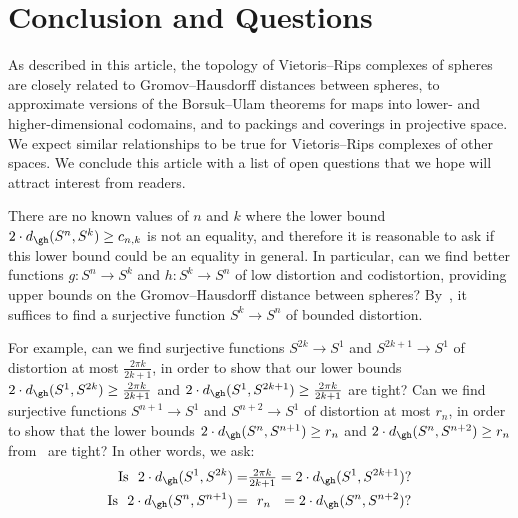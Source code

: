 \documentclass[11pt, reqno, english]{amsart}
\begin{document}
\section{Conclusion and Questions}
\label{sec:conclusion}

As described in this article, the topology of Vietoris--Rips complexes of spheres are closely related to Gromov--Hausdorff distances between spheres, to approximate versions of the Borsuk--Ulam theorems for maps into lower- and higher-dimensional codomains, and to packings and coverings in projective space.
We expect similar relationships to be true for Vietoris--Rips complexes of other spaces.
We conclude this article with a list of open questions that we hope will attract interest from readers.

\begin{question}
\label{ques:upper}
There are no known values of $n$ and $k$ where the lower bound 
$2\cdot d_{\gh}(S^n, S^k) \geq c_{n,k}$
is not an equality, and therefore it is reasonable to ask if this lower bound could be an equality in general.
In particular, can we find better functions $g\colon S^n \to S^k$ and $h\colon S^k \to S^n$ of low distortion and codistortion, providing upper bounds on the Gromov--Hausdorff distance between spheres?
By~\cite[Remark~1.1]{lim2021gromov}, it suffices to find a surjective function $S^k \to S^n$ of bounded distortion.

For example, can we find surjective functions $S^{2k} \to S^1$ and $S^{2k+1} \to S^1$ of distortion at most $\frac{2\pi k}{2k+1}$, in order to show that our lower bounds $2\cdot d_\gh(S^1,S^{2k})\ge \frac{2\pi k}{2k+1}$ and $2\cdot d_\gh(S^1,S^{2k+1})\ge \frac{2\pi k}{2k+1}$ are tight?
Can we find surjective functions $S^{n+1} \to S^1$ and $S^{n+2} \to S^1$ of distortion at most $r_n$, in order to show that the lower bounds $2\cdot d_\gh(S^n,S^{n+1})\ge r_n$ and $2\cdot d_\gh(S^n,S^{n+2})\ge r_n$ from~\cite{lim2021gromov} are tight?
In other words, we ask:
\begin{align*}
\text{Is\ \ }2\cdot d_{\gh}(S^1,S^{2k})=&\tfrac{2\pi k}{2k+1}=2\cdot d_{\gh}(S^1,S^{2k+1})? \\
\text{Is\ \ }2\cdot d_{\gh}(S^n,S^{n+1})=&\ \ r_n\ \ =2\cdot d_{\gh}(S^n,S^{n+2})?
\end{align*}

\end{question}
\end{document}
